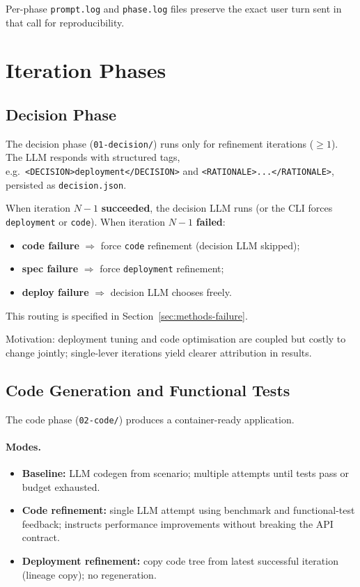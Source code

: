 Per-phase \texttt{prompt.log} and \texttt{phase.log} files preserve the exact
user turn sent in that call for reproducibility.


\section{Iteration Phases}
\label{sec:methods-phases}

\subsection{Decision Phase}
\label{sec:methods-decision}

The decision phase (\texttt{01-decision/}) runs only for refinement iterations
($\geq 1$).  The LLM responds with structured tags, e.g.\
\texttt{<DECISION>deployment</DECISION>} and
\texttt{<RATIONALE>...</RATIONALE>}, persisted as \texttt{decision.json}.

When iteration $N{-}1$ \textbf{succeeded}, the decision LLM runs (or the CLI
forces \texttt{deployment} or \texttt{code}).  When iteration $N{-}1$
\textbf{failed}:
\begin{itemize}
  \item \textbf{code failure} $\Rightarrow$ force \texttt{code} refinement
        (decision LLM skipped);
  \item \textbf{spec failure} $\Rightarrow$ force \texttt{deployment}
        refinement;
  \item \textbf{deploy failure} $\Rightarrow$ decision LLM chooses freely.
\end{itemize}
This routing is specified in Section~\ref{sec:methods-failure}.

Motivation: deployment tuning and code optimisation are coupled but costly to
change jointly; single-lever iterations yield clearer attribution in results.


\subsection{Code Generation and Functional Tests}
\label{sec:methods-code}

The code phase (\texttt{02-code/}) produces a container-ready application.

\paragraph{Modes.}
\begin{itemize}
  \item \textbf{Baseline:} LLM codegen from scenario; multiple attempts until
        tests pass or budget exhausted.
  \item \textbf{Code refinement:} single LLM attempt using benchmark and
        functional-test feedback; instructs performance improvements without
        breaking the API contract.
  \item \textbf{Deployment refinement:} copy code tree from latest successful
        iteration (lineage copy); no regeneration.
\end{itemize}

